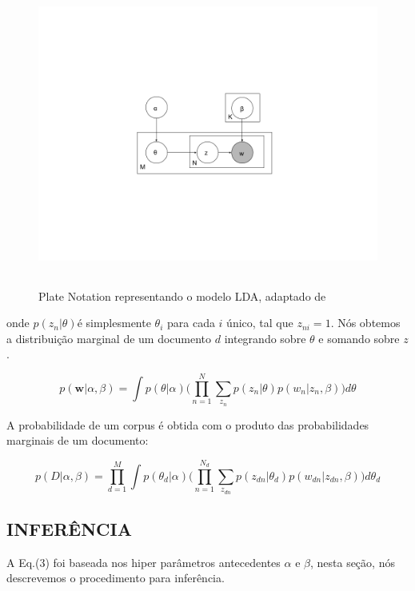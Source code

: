 \documentclass[12pt,a4paper]{article}
\begin{document}
\begin{figure}[h]
	\centering
    \includegraphics[height=10cm]{images/figure_1.png}
    \caption{Plate Notation representando o modelo LDA, adaptado de }
\end{figure}

onde $p(z_n | \theta)$é simplesmente $\theta _i$ para cada $i$ único, tal que $z_{ni}=1$. Nós obtemos a distribuição marginal de um documento $d$ integrando sobre $\theta$ e somando sobre $z$.

\begin{equation}
p(\textbf{w}|\alpha,\beta)=\int{p(\theta|\alpha)\Bigg(\prod_{n=1}^{N}\sum_{z_n} p(z_n|\theta)p(w_n|z_n,\beta)\Bigg)d\theta}
\end{equation}

A probabilidade de um corpus é obtida com o produto das probabilidades marginais de um documento:

\begin{equation}
p(D|\alpha,\beta)= \prod_{d=1}^{M} \int{p(\theta _d|\alpha)\Bigg(\prod_{n=1}^{N_d}\sum_{z_{dn}} p(z_{dn}|\theta _d)p(w_{dn}|z_{dn},\beta)\Bigg)d\theta _d}
\end{equation}



\subsection{INFERÊNCIA}
A Eq.(3) foi baseada nos hiper parâmetros antecedentes $\alpha$ e $\beta$, nesta seção, nós descrevemos o procedimento para inferência.
\end{document}

